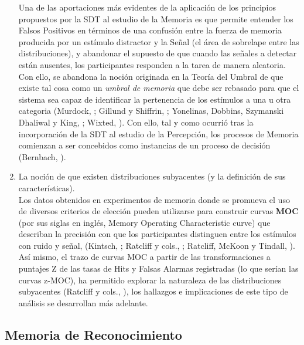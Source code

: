 \begin{enumerate}
Una de las aportaciones más evidentes de la aplicación de los principios propuestos por la SDT al estudio de la Memoria es que permite entender los Falsos Positivos en términos de una confusión entre la fuerza de memoria producida por un estímulo distractor y la Señal (el área de sobrelape entre las distribuciones), y abandonar el supuesto de que cuando las señales a detectar están ausentes, los participantes responden a la tarea de manera aleatoria. Con ello, se abandona la noción originada en la Teoría del Umbral de que existe tal cosa como un \textit{umbral de memoria} que debe ser rebasado para que el sistema sea capaz de identificar la pertenencia de los estímulos a una u otra categoria (Murdock, \citeyear{Murdock1982}; Gillund y Shiffrin, \citeyear{Gillund1984}; Yonelinas, Dobbins, Szymanski Dhaliwal y King, \citeyear{Yonelinas1996}; Wixted, \citeyear{Wixted2007}). Con ello, tal y como ocurrió tras la incorporación de la SDT al estudio de la Percepción, los procesos de Memoria comienzan a ser concebidos como instancias de un proceso de decisión (Bernbach, \citeyear{Bernbach1967}).\\
 
\item La noción de que existen distribuciones subyacentes (y la definición de sus características).\\

Los datos obtenidos en experimentos de memoria donde se promueva el uso de diversos criterios de elección pueden utilizarse para construir curvas \textbf{MOC} (por sus siglas en inglés, Memory Operating Characteristic curve) que describan la precisión con que los participantes distinguen entre los estímulos con ruido y señal, (Kintsch, \citeyear{Kintsch1967}; Ratcliff y cols., \citeyear{Ratcliff1992}; Ratcliff, McKoon y Tindall, \citeyear{Ratcliff1994}). Así mismo, el trazo de curvas MOC a partir de las transformaciones a puntajes Z de las tasas de Hits y Falsas Alarmas registradas (lo que serían las curvas z-MOC), ha permitido explorar la naturaleza de las distribuciones subyacentes (Ratcliff y cols., \citeyear{Ratcliff1992}), los hallazgos e implicaciones de este tipo de análisis se desarrollan más adelante.\\
\end{enumerate} 

\subsection{Memoria de Reconocimiento}


